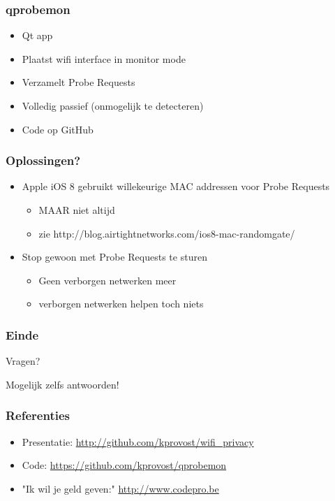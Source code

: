 \documentclass{beamer}
\begin{document}
  \begin{frame}
    \frametitle{qprobemon}

    \begin{itemize}
      \item Qt app
      \item Plaatst wifi interface in monitor mode
      \item Verzamelt Probe Requests
      \item Volledig passief (onmogelijk te detecteren)
      \item Code op GitHub
    \end{itemize}
  \end{frame}

  \begin{frame}
    \frametitle{Oplossingen?}

    \begin{itemize}
      \item Apple iOS 8 gebruikt willekeurige MAC addressen voor Probe Requests
        \begin{itemize}
          \item MAAR niet altijd
          \item zie http://blog.airtightnetworks.com/ios8-mac-randomgate/
        \end{itemize}
      \item Stop gewoon met Probe Requests te sturen
        \begin{itemize}
          \item Geen verborgen netwerken meer
          \item verborgen netwerken helpen toch niets
        \end{itemize}
    \end{itemize}
  \end{frame}

  \begin{frame}
    \frametitle{Einde}
    \begin{center}
      \Huge Vragen?
    \end{center}
    \begin{center}
      \small Mogelijk zelfs antwoorden!
    \end{center}
  \end{frame}

  \begin{frame}
    \frametitle{Referenties}
    \begin{itemize}
        \item Presentatie: \url{http://github.com/kprovost/wifi_privacy}
        \item Code: \url{https://github.com/kprovost/qprobemon}
        \item "Ik wil je geld geven:" \url{http://www.codepro.be}
    \end{itemize}
  \end{frame}
\end{document}
